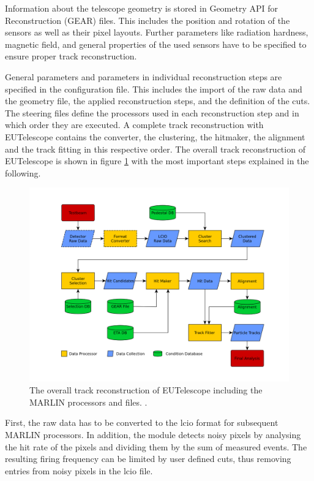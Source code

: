 Information about the telescope geometry is stored in  Geometry API for Reconstruction (GEAR) files. This includes the position and rotation
of the sensors as well as their pixel layouts. Further parameters like radiation hardness, magnetic field, and general properties of the used sensors have to be
specified to ensure proper track reconstruction.

General parameters and parameters in individual reconstruction steps are specified in the configuration file. This includes the import of the raw data and the
geometry file, the applied reconstruction steps, and the definition of the cuts. \\
The steering files define the processors used in each reconstruction step and in which order they are executed.
A complete track reconstruction with EUTelescope contains the converter, the clustering, the hitmaker, the alignment and the track fitting in this respective order.
The overall track reconstruction of EUTelescope is shown in figure \ref{fig:track_reco} with the most important steps explained in the following.

\begin{figure}
  \centering
  \includegraphics[height=0.6\textwidth]{images/track_reco.png}
  \caption{The overall track reconstruction of EUTelescope including the MARLIN processors and files. \cite{track_reco}.}
  \label{fig:track_reco}
\end{figure}

First, the raw data has to be converted to the lcio format for subsequent MARLIN processors. In addition, the module detects noisy pixels by analysing the
hit rate of the pixels and dividing them by the sum of measured events. The resulting firing frequency can be limited by user defined cuts, thus removing entries
from noisy pixels in the lcio file.

